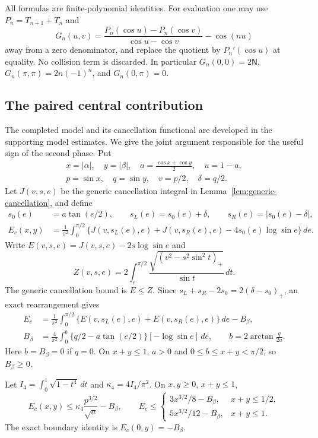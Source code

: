 All formulas are finite-polynomial identities.  For evaluation one may
use $P_n=T_{n+1}+T_n$ and
\[
 G_n(u,v)=\frac{P_n(\cos u)-P_n(\cos v)}{\cos u-\cos v}-\cos(nu)
\]
away from a zero denominator, and replace the quotient by
$P_n'(\cos u)$ at equality.  No collision term is discarded.  In
particular $G_n(0,0)=2\mathsf N$, $G_n(\pi,\pi)=2n(-1)^n$, and
$G_n(0,\pi)=0$.

\subsection{The paired central contribution}

The completed model and its cancellation functional are developed in
the supporting model estimates.  We give the joint argument responsible
for the useful sign of the second phase.  Put
\begin{gather*}
 x=|\alpha|,\quad y=|\beta|,\quad
 a=\frac{\cos x+\cos y}{2},\quad u=1-a,\\
 p=\sin x,\quad q=\sin y,\quad v=p/2,\quad\delta=q/2.
\end{gather*}
Let $J(v,s,e)$ be the generic cancellation integral in
Lemma~\ref{lem:generic-cancellation}, and define
\begin{align}
 s_0(e)&=a\tan(e/2),\qquad
 s_L(e)=s_0(e)+\delta,\qquad s_R(e)=|s_0(e)-\delta|,\nonumber\\
 E_c(x,y)&=\frac1{\pi^2}\int_0^{\pi/2}
 \{J(v,s_L(e),e)+J(v,s_R(e),e)-4s_0(e)\log\sin e\}\,de.
                                                        \label{eq:argmax-central-integral}
\end{align}
Write $E(v,s,e)=J(v,s,e)-2s\log\sin e$ and
\[
 Z(v,s,e)=2\int_e^{\pi/2}
           \frac{\sqrt{(v^2-s^2\sin^2t)_+}}{\sin t}\,dt.
\]
The generic cancellation bound is $E\leq Z$.  Since
$s_L+s_R-2s_0=2(\delta-s_0)_+$, an exact rearrangement gives
\begin{align}
 E_c&=\frac1{\pi^2}\int_0^{\pi/2}
              \{E(v,s_L(e),e)+E(v,s_R(e),e)\}\,de-B_\beta,\nonumber\\
 B_\beta&=\frac4{\pi^2}\int_0^b
        \{q/2-a\tan(e/2)\}[-\log\sin e]\,de,\qquad
 b=2\arctan\frac q{2a}.                             \label{eq:argmax-beta-baseline}
\end{align}
Here $b=B_\beta=0$ if $q=0$.  On $x+y\leq1$, $a>0$ and
$0\leq b\leq x+y<\pi/2$, so $B_\beta\geq0$.

\begin{lemma}
\label{lem:argmax-central-pair}
Let $I_4=\int_0^1\sqrt{1-t^4}\,dt$ and $\kappa_4=4I_4/\pi^2$.
On $x,y\geq0$, $x+y\leq1$,
\begin{equation}
 E_c(x,y)\leq\kappa_4\frac{p^{3/2}}{\sqrt a}-B_\beta,
 \qquad
 E_c\leq
 \begin{cases}
 3x^{3/2}/8-B_\beta,&x+y\leq1/2,\\
 5x^{3/2}/12-B_\beta,&x+y\leq1.
 \end{cases}                                         \label{eq:argmax-central-pair}
\end{equation}
The exact boundary identity is $E_c(0,y)=-B_\beta$.
\end{lemma}

